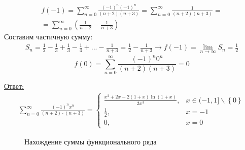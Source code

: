 \documentclass[a5paper, 10pt]{article}
\theoremstyle{definition}
\theoremstyle{plain}
\theoremstyle{remark}
\begin{document}
\begin{multline*}
f(-1) = \sum  \limits_{n = 0}^{\infty}  \frac{ (-1)^n (-1)^{n}}{(n+ 2) (n+ 3)}
 = \sum  \limits_{n = 0}^{\infty}  \frac{1}{(n+ 2)(n+ 3)}=\\
= \sum  \limits_{n = 0}^{\infty} \left(  \frac{1}{n+ 2} -  \frac{1}{n+ 3} \right) 
\end{multline*}
Составим частичную сумму:
\begin{multline*}
 S_n = \frac{1}{2} -  \frac{1}{3} +\frac{1}{3} -  \frac{1}{4} +... - \frac{1}{n+ 3} =  \frac{1}{2} - \frac{1}{n+ 3} \to 
f(-1) = \lim_{n \to \infty} S_n = \frac{1}{2}
\end{multline*}
\begin{equation*}
f(0) = \sum  \limits_{n = 0}^{\infty}  \frac{ (-1)^n 0^{n}}{(n+ 2) (n+ 3)}
 = 0
\end{equation*}


\underline{Ответ:}  \begin{multline*}
\sum  \limits_{n = 0}^{\infty} \frac{(-1)^n x^n}{(n+ 2) \cdot(n+ 3)} = 
 \begin{cases}
   \frac{ x^2 + 2x -2(1+x) \ln(1+x)}{2x^3}, & x \in (-1, 1] \backslash \left\{0 \right\}\\
   \frac{1}{2}, & x = -1\\
     0, & x = 0
 \end{cases}
\end{multline*}

\begin{figure}[h]
	           \caption{Нахождение суммы функционального ряда}
\end{figure}
\end{document}
